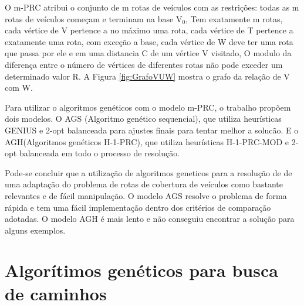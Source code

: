 O m-PRC atribui o conjunto de m rotas de veículos com as restrições: todas as m rotas de veículos começam e terminam na base V$_0$, Tem exatamente m rotas, cada vértice de V pertence a no máximo uma rota, cada vértice de T pertence a exatamente uma rota, com exceção a base, cada vértice de W deve ter uma rota que passa por ele e em uma distancia C de um vértice V visitado, O modulo da diferença entre o número de vértices de diferentes rotas não pode exceder um determinado valor R. A Figura \ref{fig:GrafoVUW} mostra o grafo da relação de V com W.

\begin{minipage}{\linewidth}
	\label{fig:GrafoVUW}
\end{minipage}

Para utilizar o algoritmos genéticos com o modelo m-PRC, o trabalho propõem dois modelos. O AGS (Algoritmo genético sequencial), que utiliza heurísticas GENIUS e 2-opt balanceada para ajustes finais para tentar melhor a solucão. E o AGH(Algoritmos genéticos H-1-PRC), que utiliza heurísticas H-1-PRC-MOD e 2-opt balanceada em todo o processo de resolução.

Pode-se concluir que a utilização de algoritmos geneticos para a resolução de de uma adaptação do problema de rotas de cobertura de veículos como bastante relevantes e de fácil manipulação. O modelo AGS resolve o problema de forma rápida e tem uma fácil implementação dentro dos critérios de comparação adotadas. O modelo AGH é mais lento e não conseguiu encontrar a solução para alguns exemplos.

\section{Algorítimos genéticos para busca de caminhos}

